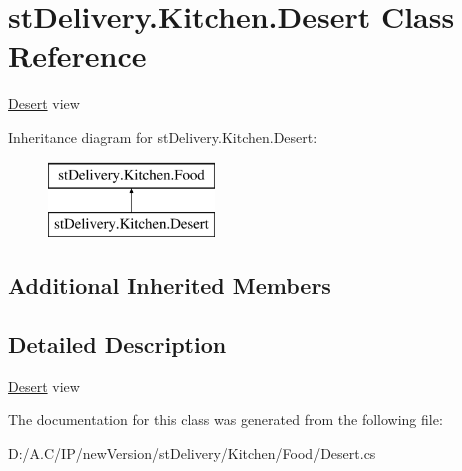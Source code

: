 \hypertarget{classst_delivery_1_1_kitchen_1_1_desert}{}\section{st\+Delivery.\+Kitchen.\+Desert Class Reference}
\label{classst_delivery_1_1_kitchen_1_1_desert}


\hyperlink{classst_delivery_1_1_kitchen_1_1_desert}{Desert} view  


Inheritance diagram for st\+Delivery.\+Kitchen.\+Desert\+:\begin{figure}[H]
\begin{center}
\leavevmode
\includegraphics[height=2.000000cm]{classst_delivery_1_1_kitchen_1_1_desert}
\end{center}
\end{figure}
\subsection*{Additional Inherited Members}


\subsection{Detailed Description}
\hyperlink{classst_delivery_1_1_kitchen_1_1_desert}{Desert} view 



The documentation for this class was generated from the following file\+:\begin{DoxyCompactItemize}
\item 
D\+:/\+A.\+C/\+I\+P/new\+Version/st\+Delivery/\+Kitchen/\+Food/Desert.\+cs\end{DoxyCompactItemize}
